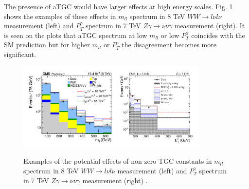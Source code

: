 The presence of aTGC would have larger effects at high energy scales. Fig. \ref{fig:aTGC_Pt_Examples} shows the examples of these effects in $m_{ll}$ spectrum in 8 TeV $WW \rightarrow l\nu l\nu$ measurement (left) and $P_T^{\gamma}$ spectrum in 7 TeV $Z\gamma \rightarrow \nu\nu\gamma$ measurement (right). It is seen on the plots that aTGC spectrum at low $m_{ll}$ or low $P_T^{\gamma}$ coincides with the SM prediction but for higher $m_{ll}$ or $P_T^{\gamma}$ the disagreement becomes more significant.\\

\begin{figure}[htb]
  \begin{center}
    {\includegraphics[width=0.85\textwidth]{../figs/WgAbout/aTGC_Pt_Examples.png}}
    \caption{Examples of the potential effects of non-zero TGC constants in $m_{ll}$ spectrum in 8 TeV $WW \rightarrow l\nu l\nu$ measurement (left) \cite{ref_CMS_8TeV_WW} and $P_T^{\gamma}$ spectrum in 7 TeV $Z\gamma \rightarrow \nu\nu\gamma$ measurement (right) \cite{ref_CMS_7TeV_Zgnunug}.}
    \label{fig:aTGC_Pt_Examples}
  \end{center}
\end{figure}

